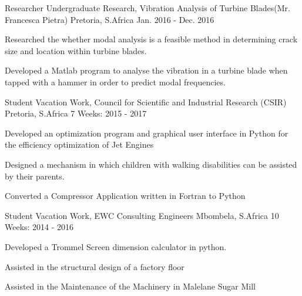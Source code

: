 \begin{cventries}
  \cventry
    {Researcher} %
    {Undergraduate Research, Vibration Analysis of Turbine Blades(Mr. Francesca Pietra)} %
    {Pretoria, S.Africa} %
    {Jan. 2016 - Dec. 2016} %
    {
      \begin{cvitems} %
        \item {Researched the whether modal analysis is a feasible method in determining crack size and location within turbine blades.}
        \item {Developed a Matlab program to analyse the vibration in a turbine blade when tapped with a hammer in order to predict modal frequencies.}
      \end{cvitems}
    }


  \cventry
    {Student} %
    {Vacation Work, Council for Scientific and Industrial Research (CSIR)} %
    {Pretoria, S.Africa} %
    {7 Weeks: 2015 - 2017} %
    {
      \begin{cvitems} %
        \item {Developed an optimization program and graphical user interface in Python for the efficiency optimization of Jet Engines}
        \item {Designed a mechanism in which children with walking disabilities can be assisted by their parents.}
        \item {Converted a Compressor Application written in Fortran to Python}
      \end{cvitems}
    }

  \cventry
    {Student} %
    {Vacation Work, EWC Consulting Engineers} %
    {Mbombela, S.Africa} %
    {10 Weeks: 2014 - 2016} %
    {
      \begin{cvitems} %
        \item {Developed a Trommel Screen dimension calculator in python.}
        \item {Assisted in the structural design of a factory floor}
        \item {Assisted in the Maintenance of the Machinery in Malelane Sugar Mill}
      \end{cvitems}
    }

\end{cventries}
